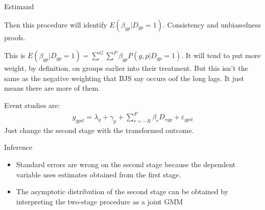 \documentclass{beamer}
\begin{document}
\begin{frame}{Estimand}

Then this procedure will identify $E(\beta_{gp} | D_{gp}=1)$. Consistency and unbiasedness proofs. 

\bigskip

This is $E(\beta_{gp}|D_{gp}=1) = \sum^G \sum^P \beta_{gp} P(g,p|D_{gp}=1)$. It will tend to put more weight, by definition, on groups earlier into their treatment.  But this isn't the same as the negative weighting that BJS say occurs oof the long lags.  It just means there are more of them.

\bigskip

Event studies are:
\begin{eqnarray*}
y_{gpit} = \lambda_g + \gamma_p + \sum_{r=-R}^P \beta_rD_{rgp} + \varepsilon_{gpit}
\end{eqnarray*}Just change the second stage with the transformed outcome. 

\end{frame}

\begin{frame}{Inference}

\begin{itemize}
\item Standard errors are wrong on the second stage because the dependent variable uses estimates obtained from the first stage. 
\item The asymptotic distribution of the second stage can be obtained by interpreting the two-stage procedure as a joint GMM
\end{itemize}

\end{frame}
\end{document}
